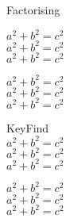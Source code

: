 


  




\begin{bxExample}{Factorising}


$ a^2 + b^2 = c^2 $ \\



$ a^2 + b^2 = c^2 $ \\

$ a^2 + b^2 = c^2 $ \\

\tcblower

$ a^2 + b^2 = c^2 $ \\


$ a^2 + b^2 = c^2 $ \\

$ a^2 + b^2 = c^2 $

\end{bxExample}



\begin{bxIntro}[Factorising]

KeyFind\\

$ a^2 + b^2 = c^2 $ \\



$ a^2 + b^2 = c^2 $ \\

$ a^2 + b^2 = c^2 $ \\

\tcblower

$ a^2 + b^2 = c^2 $ \\


$ a^2 + b^2 = c^2 $ \\

$ a^2 + b^2 = c^2 $

\end{bxIntro}


